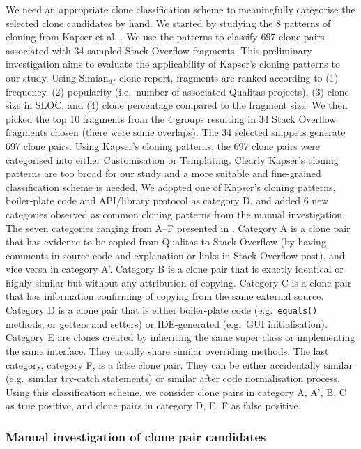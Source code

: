 \documentclass{sig-alternate-05-2015}
\begin{document}
We need an appropriate clone classification scheme to meaningfully categorise the selected clone candidates by hand. We started by studying the 8 patterns of cloning from Kapser et al. \cite{Kapser2006}. We use the patterns to classify 697 clone pairs associated with 34 sampled Stack Overflow fragments. This preliminary investigation aims to evaluate the applicability of Kapser's cloning patterns to our study. Using Simian$_{df}$ clone report, fragments are ranked according to (1) frequency, (2) popularity (i.e.~number of associated Qualitas projects), (3) clone size in SLOC, and (4) clone percentage compared to the fragment size. We then picked the top 10 fragments from the 4 groups resulting in 34 Stack Overflow fragments chosen (there were some overlaps). The 34 selected snippets generate 697 clone pairs. Using Kapser's cloning patterns, the 697 clone pairs were categorised into either Customisation or Templating. Clearly Kapser's cloning patterns are too broad for our study and a more suitable and fine-grained classification scheme is needed. We adopted one of Kapser's cloning patterns, boiler-plate code and API/library protocol as category D, and added 6 new categories observed as common cloning patterns from the manual investigation. The seven categories ranging from A--F presented in . Category A is a clone pair that has evidence to be copied from Qualitas to Stack Overflow (by having comments in source code and explanation or links in Stack Overflow post), and vice versa in category A'. Category B is a clone pair that is exactly identical or highly similar but without any attribution of copying. Category C is a clone pair that has information confirming of copying from the same external source. Category D is a clone pair that is either boiler-plate code (e.g.~\verb|equals()| methods, or getters and setters) or IDE-generated (e.g.~GUI initialisation). Category E are clones created by inheriting the same super class or implementing the same interface. They usually share similar overriding methods. The last category, category F, is a false clone pair. They can be either accidentally similar (e.g.~similar try-catch statements) or similar after code normalisation process. Using this classification scheme, we consider clone pairs in category A, A', B, C as true positive, and clone pairs in category D, E, F as false positive. 

\subsubsection{Manual investigation of clone pair candidates}
\end{document}
